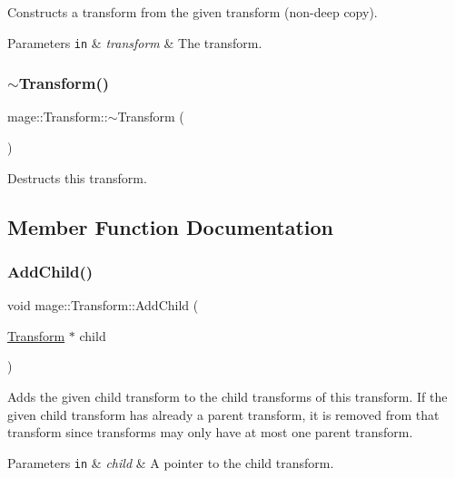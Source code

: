 Constructs a transform from the given transform (non-\/deep copy).


\begin{DoxyParams}[1]{Parameters}
\mbox{\tt in}  & {\em transform} & The transform. \\
\hline
\end{DoxyParams}
\hypertarget{structmage_1_1_transform_a3380713ee853d112c140e8688c0f73b5}{}\label{structmage_1_1_transform_a3380713ee853d112c140e8688c0f73b5} 
\subsubsection{\texorpdfstring{$\sim$\+Transform()}{~Transform()}}
{\footnotesize\ttfamily mage\+::\+Transform\+::$\sim$\+Transform (\begin{DoxyParamCaption}{ }\end{DoxyParamCaption})}

Destructs this transform. 

\subsection{Member Function Documentation}
\hypertarget{structmage_1_1_transform_ad3f02e778de604f907041218bd2dab0c}{}\label{structmage_1_1_transform_ad3f02e778de604f907041218bd2dab0c} 
\subsubsection{\texorpdfstring{Add\+Child()}{AddChild()}}
{\footnotesize\ttfamily void mage\+::\+Transform\+::\+Add\+Child (\begin{DoxyParamCaption}\item[{\hyperlink{structmage_1_1_transform}{Transform} $\ast$}]{child }\end{DoxyParamCaption})}

Adds the given child transform to the child transforms of this transform. If the given child transform has already a parent transform, it is removed from that transform since transforms may only have at most one parent transform.


\begin{DoxyParams}[1]{Parameters}
\mbox{\tt in}  & {\em child} & A pointer to the child transform. \\
\hline
\end{DoxyParams}
\hypertarget{structmage_1_1_transform_a71126843acf10e00d0381b5463978aba}{}\label{structmage_1_1_transform_a71126843acf10e00d0381b5463978aba} 
